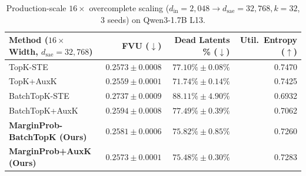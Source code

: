 \documentclass[10pt]{article}
\begin{document}
\begin{table}[t]
  \centering
  \caption{Production-scale $16\times$ overcomplete scaling ($d_{\mathrm{in}}=2{{,}}048 \to d_{\mathrm{sae}}=32{{,}}768, k=32$, 3 seeds) on Qwen3-1.7B L13.}
  \label{tab:sae_16x}
  \scriptsize
  \begin{tabular}{lrrr}
    \toprule
    Method ($16\times$ Width, $d_{\mathrm{sae}}=32{{,}}768$) & FVU ($\downarrow$) & Dead Latents \% ($\downarrow$) & Util.\ Entropy ($\uparrow$) \\
    \midrule
    TopK-STE \citep{gao2024scaling} & $0.2573\pm0.0008$ & $77.10\%\pm0.08\%$ & 0.7470 \\
    TopK+AuxK \citep{gao2024scaling} & $0.2559\pm0.0001$ & $71.74\%\pm0.14\%$ & 0.7425 \\
    BatchTopK-STE \citep{bussmann2024batchtopk} & $0.2737\pm0.0009$ & $88.11\%\pm4.90\%$ & 0.6932 \\
    BatchTopK+AuxK \citep{bussmann2024batchtopk} & $0.2594\pm0.0008$ & $77.49\%\pm0.39\%$ & 0.7062 \\
    \textbf{MarginProb-BatchTopK (Ours)} & $0.2581\pm0.0006$ & $75.82\%\pm0.85\%$ & 0.7260 \\
    \textbf{MarginProb+AuxK (Ours)} & $0.2573\pm0.0001$ & $75.48\%\pm0.30\%$ & 0.7283 \\
    \bottomrule
  \end{tabular}
\end{table}

\begin{table}[t]
  \centering
  \caption{SAEBench-style Sparse Probing ($k \in \{1,5,20\}$ top latents/class) and Automated LLM-as-a-Judge Feature Interpretability (Qwen3.8-27B blind detection F1 \& balanced accuracy, Qwen3-1.7B L13).}
  \label{tab:sae_autointerp}
  \scriptsize
\end{table}
\end{document}
